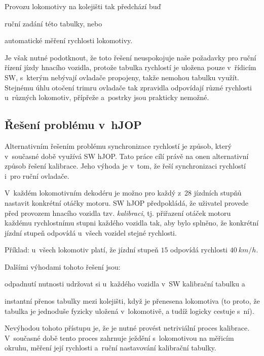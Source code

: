 Provozu lokomotivy na kolejišti tak předchází buď

\begin{compactitem}
	\item ruční zadání této tabulky, nebo
	\item automatické měření rychlosti lokomotivy.
\end{compactitem}

Je však nutné podotknout, že toto řešení neuspokojuje naše požadavky pro
ruční řízení jízdy hnacího vozidla, protože tabulka rychlostí je uložena
pouze v~řídicím SW, s~kterým nebývají ovladače propojeny, takže nemohou tabulku
využít. Stejnému úhlu otočení trimru ovladače tak zpravidla odpovídají různé
rychlosti u~různých lokomotiv, přípřeže a~postrky jsou prakticky nemožné.

\subsection{Řešení problému v~hJOP}

Alternativním řešením problému synchronizace rychlostí je způsob, který
v~současné době využívá SW hJOP. Tato práce cílí právě na onen alternativní
způsob řešení kalibrace. Jeho výhoda je v~tom, že řeší synchronizaci
rychlostí i~pro ruční ovladače.

V~každém lokomotivním dekodéru je možno pro každý z~28 jízdních stupňů nastavit
konkrétní otáčky motoru. SW hJOP předpokládá, že uživatel provede před
provozem hnacího vozidla tzv. \textit{kalibraci}, tj. přiřazení otáček motoru
každému rychlostnímu stupni každého vozidla tak, aby bylo splněno, že konkrétní
jízdní stupeň odpovídá u~všech vozidel stejné rychlosti.

Příklad: u~všech lokomotiv platí, že jízdní stupeň $15$ odpovídá rychlosti $40\
km/h$.

Dalšími výhodami tohoto řešení jsou:

\begin{compactenum}
	\item odpadnutí nutnosti udržovat si u~každého vozidla v~SW kalibrační
	tabulku a
	\item instantní přenos tabulky mezi kolejišti, když je přenesena
	lokomotiva (to proto, že tabulka je jednoduše fyzicky uložená v~lokomotivě,
	a tudíž logicky cestuje s~ní).
\end{compactenum}

Nevýhodou tohoto přístupu je, že je nutné provést netriviální proces kalibrace.
V~současné době tento proces zahrnuje ježdění s~lokomotivou na měřicím okruhu,
měření její rychlosti a~ruční nastavování kalibrační tabulky.

